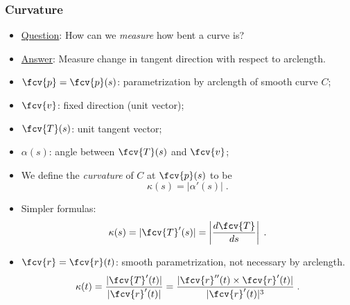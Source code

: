 \begin{frame}
\frametitle{Curvature}
\begin{itemize}
\item \underline{Question}: How can we \emph{measure} how bent a curve is?
\item \underline{Answer}: Measure change in tangent direction with respect to arclength.
\end{itemize}
 \begin{itemize}
\item $\fcv{p}=\fcv{p}(s)$: parametrization by arclength of smooth curve $C$;
\item $\fcv{v}$: fixed direction (unit vector);
\item $\fcv{T}(s)$: unit tangent vector;
\item $\alpha(s)$: angle between $\fcv{T}(s)$ and $\fcv{v}$;
\item We define the \emph{curvature} of $C$ at $\fcv{p}(s)$ to be
\[\kappa(s) = \left| \alpha'(s) \right|\; .
\]
\item Simpler formulas:
\[\kappa(s) = | \fcv{T}'(s) | = \left| \frac{d\fcv{T}}{ds}\right| \; .
\]
\item $\fcv{r}=\fcv{r}(t)$: smooth parametrization, not necessary by arclength.
\[\kappa(t) = \frac{|\fcv{T}'(t)|}{|\fcv{r}'(t)|} = \frac{|\fcv{r}''(t) \times \fcv{r}'(t)|}
{|\fcv{r}'(t)|^3}\; .
\]
\end{itemize} 
\end{frame}